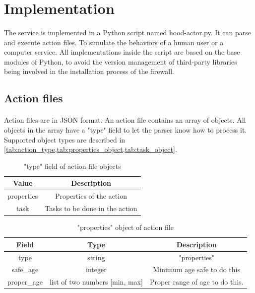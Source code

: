 \documentclass[mscthesis]{usiinfthesis}
\begin{document}
\section{Implementation}
\paragraph{}
The service is implemented in a Python script named hood-actor.py. It can parse and execute action files. To simulate the behaviors of a human user or a computer service. All implementations inside the script are based on the base modules of Python, to avoid the version management of third-party libraries being involved in the installation process of the firewall.

\subsection{Action files}
\paragraph{}
Action files are in JSON format. An action file contains an array of objects. All objects in the array have a "type" field to let the parser know how to process it. Supported object types are described in \cref{tab:action_type,tab:properties_object,tab:task_object}.

\begin{table}[H]
  \centering
  \begin{tabular}{|c|c|}
    \hline
    Value      & Description                    \\
    \hline
    properties & Properties of the action       \\
    task       & Tasks to be done in the action \\
    \hline
  \end{tabular}
  \caption{"type" field of action file objects}
  \label{tab:action_type}
\end{table}


\begin{table}[H]
  \centering
  \begin{tabular}{|c|c|c|}
    \hline
    Field       & Type                           & Description                     \\
    \hline
    type        & string                         & "properties"                    \\
    safe\_age   & integer                        & Minimum age safe to do this     \\
    proper\_age & list of two numbers [min, max] & Proper range of age to do this. \\
    \hline
  \end{tabular}
  \caption{"properties" object of action file}
  \label{tab:properties_object}
\end{table}
\end{document}
